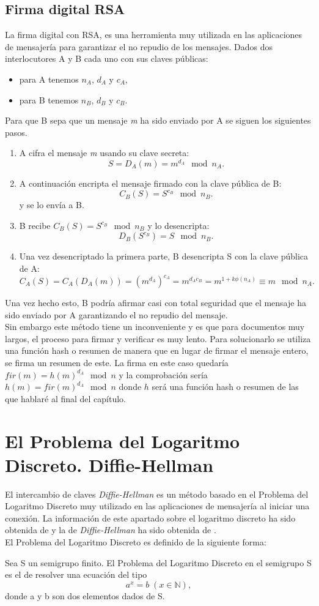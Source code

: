 \subsection{Firma digital RSA}
La firma digital con RSA, es una herramienta muy utilizada en las aplicaciones de mensajería para garantizar el no repudio de los mensajes.
Dados dos interlocutores A y B cada uno con sus claves públicas:
\begin{itemize}
	\item para A tenemos $n_A$, $d_A$ y $c_A$,  
	\item para B tenemos $n_B$, $d_B$ y $c_B$.  
\end{itemize}
Para que B sepa que un mensaje \emph{m} ha sido enviado por A se siguen los siguientes pasos.
\begin{enumerate}
	\item A cifra el mensaje \emph{m} usando su clave secreta:
		$$
			S=D_A(m)=m^{d_A} \mod n_A.
		$$
	\item A continuación encripta el mensaje firmado con la clave pública de B:
		$$
			C_B(S)=S^{c_B}\mod n_B.
		$$
		y se lo envía a B.
	\item B recibe $C_B(S)=S^{c_B} \mod n_B$ y lo desencripta: 
		$$
			D_B(S^{c_B})=S \mod n_B.
		$$
	\item Una vez desencriptado la primera parte, B desencripta S con la clave pública de A:
		$$
			C_A(S)=C_A(D_A(m))=(m^{d_A})^{c_A}=m^{d_Ac_B}=m^{1+k\phi(n_A)}\equiv m \mod n_A.
		$$
\end{enumerate}
Una vez hecho esto, B podría afirmar casi con total seguridad que el mensaje ha sido enviado por A garantizando el no repudio del mensaje.\\
Sin embargo este método tiene un inconveniente y es que para documentos muy largos, el proceso para firmar y verificar es muy lento. Para solucionarlo se utiliza una función hash o resumen de manera que en lugar de firmar el mensaje entero, se firma un resumen de este. La firma en este caso quedaría $fir(m)=h(m)^{d_A} \mod n$ y la comprobación sería $h(m)=fir(m)^{d_A} \mod n$ donde $h$ será una función hash o resumen de las que hablaré al final del capítulo.

\section{El Problema del Logaritmo Discreto. Diffie-Hellman}
El intercambio de claves \emph{Diffie-Hellman} es un método basado en el Problema del Logaritmo Discreto muy utilizado en las aplicaciones de mensajería al iniciar una conexión. La información de este apartado sobre el logaritmo discreto ha sido obtenida de \cite{angelRiosMateos} y la de \emph{Diffie-Hellman} ha sido obtenida de \cite{En2011}.\\
El Problema del Logaritmo Discreto es definido de la siguiente forma:
\begin{definicion}
	Sea S un semigrupo finito. El Problema del Logaritmo Discreto en el semigrupo S es el de resolver una ecuación del tipo\\
		$$
			a^x\!=b\;(x\in \mathbb{N}),
		$$
	donde a y b son dos elementos dados de S.
\end{definicion}


